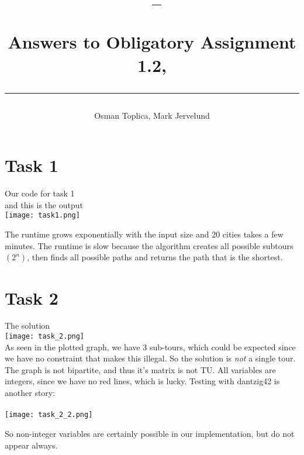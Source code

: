 \documentclass[a4paper,10pt]{article}
\title{\begin{flushleft}
\vspace{-4ex}
\courseid~-- \coursename \\[0.2cm]
{\Large Answers to Obligatory Assignment 1.2, \term \\[3ex]
\hrule}
\end{flushleft}
}
\date{}
\author{Osman Toplica, Mark Jervelund}
\begin{document}
\maketitle

\section*{Task 1}
Our code for task 1\\


and this is the output\\
\texttt{[image: task1.png]}

The runtime grows exponentially with the input size and 20 cities takes a few minutes. The runtime is slow because the algorithm creates all possible subtours $(2^n)$, then finds all possible paths and returns the path that is the shortest.
\newpage


\section*{Task 2}

The solution\\
\texttt{[image: task\_2.png]}
\\

As seen in the plotted graph, we have 3 sub-tours, which could be expected since we have no constraint that makes this illegal. So the solution is \emph{not} a single tour. The graph is not bipartite, and thus it's matrix is not TU. All variables are integers, since we have no red lines, which is lucky. Testing with dantzig42 is another story:\\
\\
\texttt{[image: task\_2\_2.png]}

So non-integer variables are certainly possible in our implementation, but do not appear always.

\newpage
\end{document}
